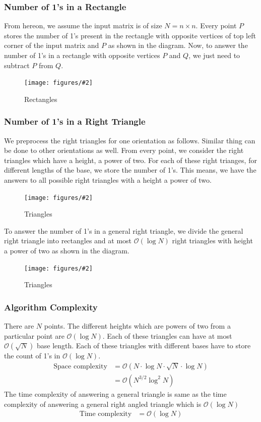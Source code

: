 \documentclass{article}
\newcommand{\addpicture}[4]
{ \begin{figure}[H] \centering \texttt{[image: figures/\#2]} \caption{#4} \label{#3}  \end{figure} }
\begin{document}
\subsubsection{Number of 1's in a Rectangle}
From hereon, we assume the input matrix is of size $N = n \times n$. Every point $P$ stores the number of 1's present in the rectangle with opposite vertices of top left corner of the input matrix and $P$ as shown in the diagram. Now, to answer the number of 1's in a rectangle with opposite vertices $P$ and $Q$, we just need to subtract $P$ from $Q$.

\addpicture{width=2in}{rectangles.png}{rectangles}{Rectangles}

\subsubsection{Number of 1's in a Right Triangle}
We preprocess the right triangles for one orientation as follows. Similar thing can be done to other orientations as well. From every point, we consider the right triangles which have a height, a power of two. For each of these right trianges, for different lengths of the base, we store the number of 1's. This means, we have the answers to all possible right triangles with a height a power of two.

\addpicture{width=2.5in}{trianglescount.png}{trianglescount}{Triangles}

To answer the number of 1's in a general right triangle, we divide the general right triangle into rectangles and at most $\mathcal{O}(\log N)$ right triangles with height a power of two as shown in the diagram.

\addpicture{width=2.5in}{triangleslog.png}{triangleslog}{Triangles}

\subsubsection{Algorithm Complexity}
There are $N$ points. The different heights which are powers of two from a particular point are $\mathcal{O}(\log N)$. Each of these triangles can have at most $\mathcal{O}(\sqrt{N})$ base length. Each of these triangles with different bases have to store the count of 1's in $\mathcal{O}(\log N)$.  
\begin{align*}
\text{Space complexity}&=\mathcal{O}(N \cdot \log N \cdot \sqrt{N} \cdot \log N) \\
&= \mathcal{O}(N^{3/2} \log^2 N)
\end{align*}
The time complexity of answering a general triangle is same as the time complexity of answering a general right angled triangle which is $\mathcal{O}(\log N)$
\begin{align*}
\text{Time complexity}&=\mathcal{O}(\log N)
\end{align*}
\end{document}
